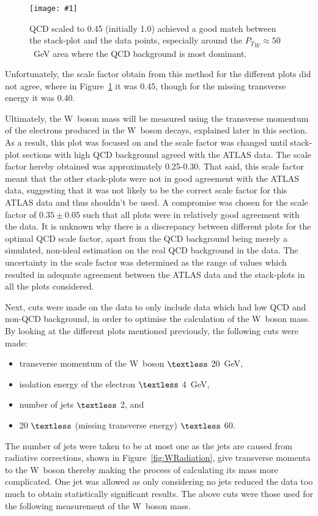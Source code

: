 \documentclass[twocolumn]{article}
\newcommand{\insertFigure}[1]{%
   \texttt{[image: \#1]}%
}
\begin{document}
\begin{figure}[!h]
	\centering
	\insertFigure{Images/ptw_scaleLabeled.png}
	\caption{QCD scaled to 0.45 (initially 1.0) achieved a good match between the stack-plot and the data points, especially around the ${P_T}_W \approx 50$~GeV area where the QCD background is most dominant.}
	\label{fig:QCDscalefactor}
\end{figure}
Unfortunately, the scale factor obtain from this method for the different plots did not agree, where in Figure~\ref{fig:QCDscalefactor} it was 0.45, though for the missing transverse energy it was 0.40. \\

\par Ultimately, the W~boson mass will be measured using the transverse momentum of the electrons produced in the W~boson decays, explained later in this section. As a result, this plot was focused on and the scale factor was changed until stack-plot sections with high QCD background agreed with the ATLAS data. The scale factor hereby obtained was approximately 0.25-0.30. That said, this scale factor meant that the other stack-plots were not in good agreement with the ATLAS data, suggesting that it was not likely to be the correct scale factor for this ATLAS data and thus shouldn't be used. A compromise was chosen for the scale factor of $0.35 \pm 0.05$ such that all plots were in relatively good agreement with the data. It is unknown why there is a discrepancy between different plots for the optimal QCD scale factor, apart from the QCD background being merely a simulated, non-ideal estimation on the real QCD background in the data. The uncertainty in the scale factor was determined as the range of values which resulted in adequate agreement between the ATLAS data and the stack-plots in all the plots considered. \\

\par Next, cuts were made on the data to only include data which had low QCD and non-QCD background, in order to optimise the calculation of the W~boson mass. By looking at the different plots mentioned previously, the following cuts were made:
\begin{itemize}
\item transverse momentum of the W~boson $\textless$ 20~GeV,
\item isolation energy of the electron $\textless$ 4~GeV,
\item number of jets $\textless$ 2, and
\item 20 $\textless$ (missing transverse energy) $\textless$ 60.
\end{itemize}
The number of jets were taken to be at most one as the jets are caused from radiative corrections, shown in Figure~\ref{fig:WRadiation}, give transverse momenta to the W~boson thereby making the process of calculating its mass more complicated. One jet was allowed as only considering no jets reduced the data too much to obtain statistically significant results. The above cuts were those used for the following measurement of the W~boson mass.
	
\end{document}
